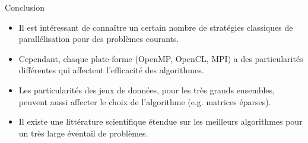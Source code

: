 \documentclass[10pt]{beamer}
\begin{document}
\begin{frame}{Conclusion}

  \begin{itemize}
    \item Il est intéressant de connaître un certain nombre de stratégies classiques de parallélisation pour des problèmes courants.

    \item Cependant, chaque plate-forme (OpenMP, OpenCL, MPI) a des particularités différentes qui affectent l'efficacité des algorithmes.

    \item Les particularités des jeux de données, pour les très grands ensembles, peuvent aussi affecter le choix de l'algorithme (e.g. matrices éparses).

    \item Il existe une littérature scientifique étendue sur les meilleurs algorithmes pour un très large éventail de problèmes.
  \end{itemize}
\end{frame}
\end{document}
